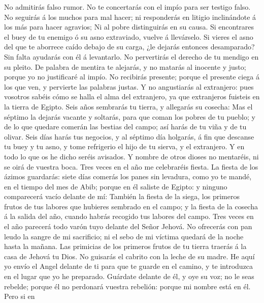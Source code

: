  No admitirás falso rumor. No te concertarás con el impío
para ser testigo falso.  No seguirás á los muchos para mal
hacer; ni responderás en litigio inclinándote á los más para hacer
agravios;  Ni al pobre distinguirás en su causa.
 Si encontrares el buey de tu enemigo ó su asno extraviado,
vuelve á llevárselo.  Si vieres el asno del que te aborrece
caído debajo de su carga, ¿le dejarás entonces desamparado? Sin falta
ayudarás con él á levantarlo.  No pervertirás el derecho de
tu mendigo en su pleito.  De palabra de mentira te alejarás,
y no matarás al inocente y justo; porque yo no justificaré al impío.
 No recibirás presente; porque el presente ciega á los que
ven, y pervierte las palabras justas.  Y no angustiarás al
extranjero: pues vosotros sabéis cómo se halla el alma del extranjero,
ya que extranjeros fuisteis en la tierra de Egipto.  Seis
años sembrarás tu tierra, y allegarás su cosecha:  Mas el
séptimo la dejarás vacante y soltarás, para que coman los pobres de tu
pueblo; y de lo que quedare comerán las bestias del campo; así harás de
tu viña y de tu olivar.  Seis días harás tus negocios, y al
séptimo día holgarás, á fin que descanse tu buey y tu asno, y tome
refrigerio el hijo de tu sierva, y el extranjero.  Y en
todo lo que os he dicho seréis avisados. Y nombre de otros dioses no
mentaréis, ni se oirá de vuestra boca.  Tres veces en el
año me celebraréis fiesta.  La fiesta de los ázimos
guardarás: siete días comerás los panes sin levadura, como yo te mandé,
en el tiempo del mes de Abib; porque en él saliste de Egipto: y ninguno
comparecerá vacío delante de mí:  También la fiesta de la
siega, los primeros frutos de tus labores que hubieres sembrado en el
campo; y la fiesta de la cosecha á la salida del año, cuando habrás
recogido tus labores del campo.  Tres veces en el año
parecerá todo varón tuyo delante del Señor Jehová.  No
ofrecerás con pan leudo la sangre de mi sacrificio; ni el sebo de mi
víctima quedará de la noche hasta la mañana.  Las primicias
de los primeros frutos de tu tierra traerás á la casa de Jehová tu Dios.
No guisarás el cabrito con la leche de su madre.  He aquí
yo envío el Angel delante de ti para que te guarde en el camino, y te
introduzca en el lugar que yo he preparado.  Guárdate
delante de él, y oye su voz; no le seas rebelde; porque él no perdonará
vuestra rebelión: porque mi nombre está en él.  Pero si en

